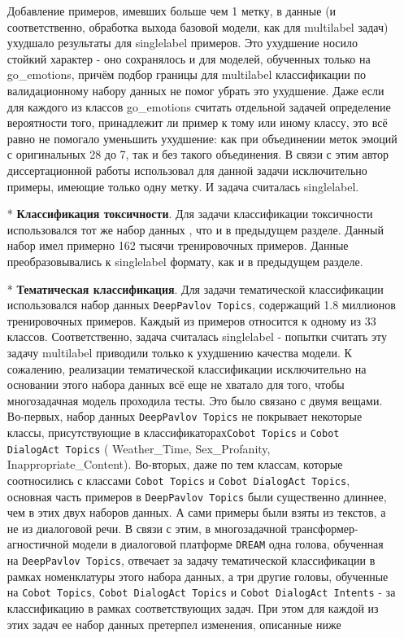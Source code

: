 \begin{itemize}
Добавление примеров, имевших больше чем 1 метку, в данные (и соответственно, обработка выхода базовой модели, как для multilabel задач) ухудшало результаты для singlelabel примеров. Это ухудшение носило стойкий характер - оно сохранялось и для моделей, обученных только на go\_emotions, причём подбор границы для multilabel классификации по валидационному набору данных не помог убрать это ухудшение. Даже если для каждого из классов go\_emotions считать отдельной задачей определение вероятности того, принадлежит ли пример к тому или иному классу, это всё равно не помогало уменьшить ухудшение: как при объединении меток эмоций с оригинальных 28 до 7, так и без такого объединения. 
В связи с этим автор диссертационной работы использовал для данной задачи исключительно примеры, имеющие только одну метку. И задача считалась singlelabel. 
 \item[*]\textbf{Классификация токсичности}. Для задачи классификации токсичности использовался тот же набор данных \cite{toxic_kaggle}, что и в предыдущем разделе. Данный набор имел примерно 162 тысячи тренировочных примеров. Данные преобразовывались к singlelabel формату, как и в предыдущем разделе. 
\item[*]\textbf{Тематическая классификация}. Для задачи тематической классификации использовался набор данных \texttt{DeepPavlov Topics}\cite{dp_topics}, содержащий 1.8 миллионов тренировочных примеров. Каждый из примеров относится к одному из 33 классов. Соответственно, задача считалась singlelabel - попытки считать эту задачу multilabel приводили только к ухудшению качества модели. 
К сожалению, реализации тематической классификации исключительно на основании этого набора данных всё еще не хватало для того, чтобы многозадачная модель проходила тесты. Это было связано с двумя вещами. Во-первых, набор данных \texttt{DeepPavlov Topics} не покрывает некоторые классы, присутствующие в классификаторах\texttt{Cobot Topics} и \texttt{Cobot DialogAct Topics} ( Weather\_Time, Sex\_Profanity, Inappropriate\_Content). Во-вторых, даже по тем классам, которые соотносились с классами \texttt{Cobot Topics} и \texttt{Cobot DialogAct Topics}, основная часть примеров в \texttt{DeepPavlov Topics} были существенно длиннее, чем в этих двух наборов данных. А сами примеры были взяты из текстов, а не из диалоговой речи. В связи с этим, в многозадачной трансформер-агностичной модели в диалоговой платформе \texttt{DREAM} одна голова, обученная на \texttt{DeepPavlov Topics}, отвечает за задачу тематической классификации в рамках номенклатуры этого набора данных, а три другие головы, обученные на \texttt{Cobot Topics}, \texttt{Cobot DialogAct Topics} и \texttt{Cobot DialogAct Intents} - за классификацию в рамках соответствующих задач. При этом для каждой из этих задач ее набор данных претерпел изменения, описанные ниже

\end{itemize}
